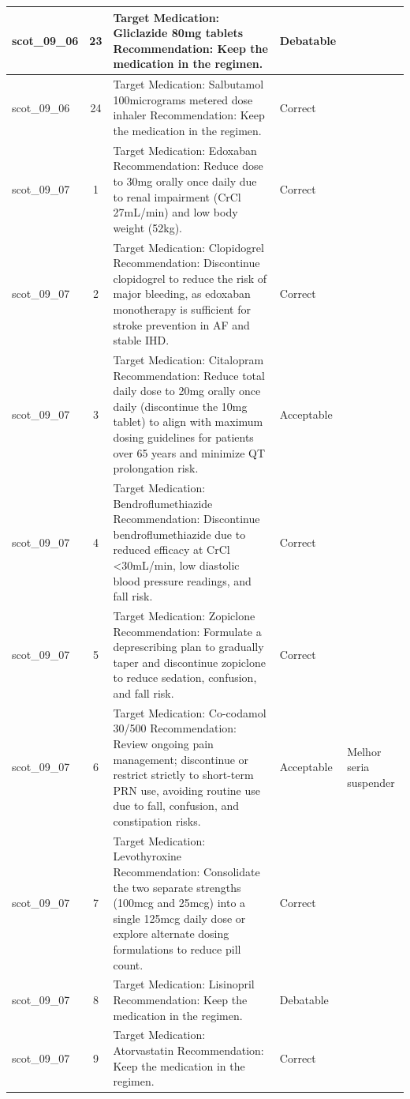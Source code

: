 \begin{longtable}{|p{1.45cm}|c|p{10.2cm}|p{1.55cm}|p{2.3cm}|}
\hline
scot\_09\_06 & 23 & Target Medication: Gliclazide 80mg tablets Recommendation: Keep the medication in the regimen. & Debatable &  \\
\hline
scot\_09\_06 & 24 & Target Medication: Salbutamol 100micrograms metered dose inhaler Recommendation: Keep the medication in the regimen. & Correct &  \\
\hline
scot\_09\_07 & 1 & Target Medication: Edoxaban Recommendation: Reduce dose to 30mg orally once daily due to renal impairment (CrCl 27mL/min) and low body weight (52kg). & Correct &  \\
\hline
scot\_09\_07 & 2 & Target Medication: Clopidogrel Recommendation: Discontinue clopidogrel to reduce the risk of major bleeding, as edoxaban monotherapy is sufficient for stroke prevention in AF and stable IHD. & Correct &  \\
\hline
scot\_09\_07 & 3 & Target Medication: Citalopram Recommendation: Reduce total daily dose to 20mg orally once daily (discontinue the 10mg tablet) to align with maximum dosing guidelines for patients over 65 years and minimize QT prolongation risk. & Acceptable &  \\
\hline
scot\_09\_07 & 4 & Target Medication: Bendroflumethiazide Recommendation: Discontinue bendroflumethiazide due to reduced efficacy at CrCl <30mL/min, low diastolic blood pressure readings, and fall risk. & Correct &  \\
\hline
scot\_09\_07 & 5 & Target Medication: Zopiclone Recommendation: Formulate a deprescribing plan to gradually taper and discontinue zopiclone to reduce sedation, confusion, and fall risk. & Correct &  \\
\hline
scot\_09\_07 & 6 & Target Medication: Co-codamol 30/500 Recommendation: Review ongoing pain management; discontinue or restrict strictly to short-term PRN use, avoiding routine use due to fall, confusion, and constipation risks. & Acceptable & Melhor seria suspender \\
\hline
scot\_09\_07 & 7 & Target Medication: Levothyroxine Recommendation: Consolidate the two separate strengths (100mcg and 25mcg) into a single 125mcg daily dose or explore alternate dosing formulations to reduce pill count. & Correct &  \\
\hline
scot\_09\_07 & 8 & Target Medication: Lisinopril Recommendation: Keep the medication in the regimen. & Debatable &  \\
\hline
scot\_09\_07 & 9 & Target Medication: Atorvastatin Recommendation: Keep the medication in the regimen. & Correct &  \\

\end{longtable}
